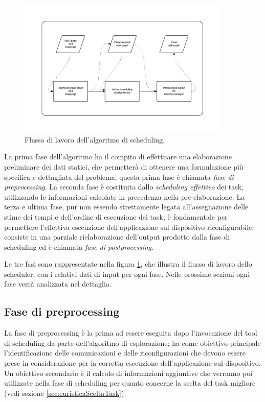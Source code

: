 \begin{figure}[ht]
 \begin{center}
\includegraphics[width=0.9\textwidth]
{capitoli/figure/cap3/SchedulerWorkflow.pdf}
  \caption{Flusso di lavoro dell'algoritmo di scheduling.}
  \label{fig:schedulerWorkflow}
 \end{center}
\end{figure}


La prima fase dell'algoritmo ha il compito di 
effettuare una elaborazione preliminare dei dati statici, che permetterà di 
ottenere una formulazione più specifica e dettagliata del problema; questa 
prima fase è chiamata \emph{fase di preprocessing}. La seconda fase è 
costituita dallo \emph{scheduling effettivo} dei task, utilizzando le 
informazioni calcolate in precedenza nella pre-elaborazione. La terza e ultima 
fase, pur non essendo strettamente legata all'assegnazione delle stime dei tempi 
e dell'ordine di esecuzione dei task, è fondamentale per permettere l'effettiva 
esecuzione dell'applicazione sul dispositivo riconfigurabile; consiste in una 
parziale rielaborazione dell'output prodotto dalla fase di scheduling ed è 
chiamata \emph{fase di postprocessing}.

Le tre fasi sono rappresentate nella figura \ref{fig:schedulerWorkflow}, che 
illustra il flusso di lavoro dello scheduler, con i relativi dati di input per 
ogni fase. Nelle prossime sezioni ogni fase verrà analizzata nel dettaglio.


\subsection{Fase di preprocessing}
\label{subsec:fasePreprocessing}
La fase di preprocessing è la prima ad essere eseguita dopo l'invocazione del 
tool di scheduling da parte dell'algoritmo di esplorazione; ha come obiettivo 
principale l'identificazione delle comunicazioni e delle riconfigurazioni che 
devono essere prese in considerazione per la corretta esecuzione 
dell'applicazione sul dispositivo. Un obiettivo secondario è il calcolo di 
informazioni aggiuntive che verranno poi utilizzate nella fase di scheduling 
per quanto concerne la scelta del task migliore (vedi sezione 
\ref{sec:euristicaSceltaTask}).

